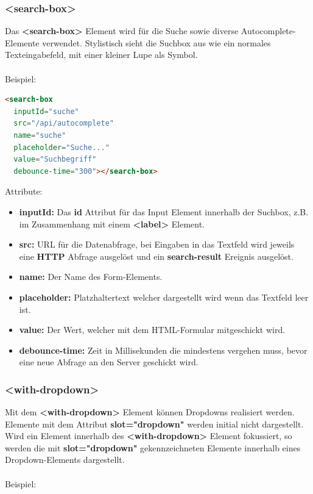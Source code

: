 \subsubsection{<search-box>}

Das \textbf{<search-box>} Element wird für die Suche sowie diverse
Autocomplete-Elemente verwendet. Stylistisch sieht die Suchbox aus wie
ein normales Texteingabefeld, mit einer kleiner Lupe als Symbol.\\
\\
\noindent{}Beispiel:

\begin{lstlisting}[language=html,frame=single]
<search-box
  inputId="suche"
  src="/api/autocomplete"
  name="suche"
  placeholder="Suche..."
  value="Suchbegriff"
  debounce-time="300"></search-box>
\end{lstlisting}

\noindent{}Attribute:
\begin{itemize}
  \tightlist{}
  \item{} \textbf{inputId:} Das \textbf{id} Attribut für das Input Element innerhalb der Suchbox, z.B. im Zusammenhang mit einem \textbf{<label>} Element.
  \item{} \textbf{src:} URL für die Datenabfrage, bei Eingaben in das Textfeld wird jeweils eine \textbf{HTTP} Abfrage ausgelöst und ein \textbf{search-result} Ereignis ausgelöst.
  \item{} \textbf{name:} Der Name des Form-Elements.
  \item{} \textbf{placeholder:} Platzhaltertext welcher dargestellt wird wenn das Textfeld leer ist.
  \item{} \textbf{value:} Der Wert, welcher mit dem HTML-Formular mitgeschickt wird.
  \item{} \textbf{debounce-time:} Zeit in Millisekunden die mindestens vergehen muss, bevor eine neue Abfrage an den Server geschickt wird.
\end{itemize}

\subsubsection{<with-dropdown>}

Mit dem \textbf{<with-dropdown>} Element können Dropdowns realisiert werden.
Elemente mit dem Attribut \textbf{slot="dropdown"} werden initial nicht dargestellt.
Wird ein Element innerhalb des \textbf{<with-dropdown>} Element fokussiert, so werden die mit \textbf{slot="dropdown"} gekennzeichneten Elemente innerhalb eines Dropdown-Elements dargestellt.\\
\\
\noindent{}Beispiel:

